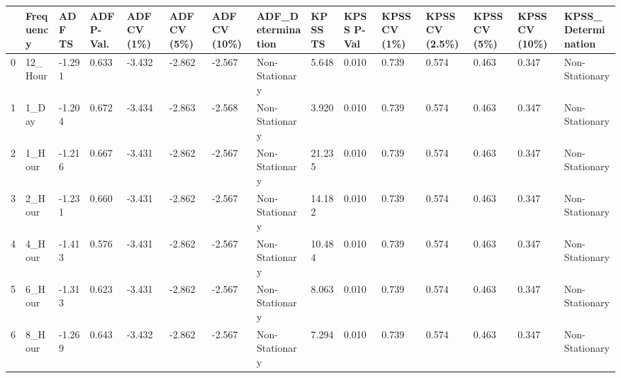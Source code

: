 \begin{tabular}{lllllllllllllll}
\toprule
 & Frequency & ADF TS & ADF P-Val. & ADF CV (1\%) & ADF CV (5\%) & ADF CV (10\%) & ADF_Determination & KPSS TS & KPSS P-Val & KPSS CV (1\%) & KPSS CV (2.5\%) & KPSS CV (5\%) & KPSS CV (10\%) & KPSS_Determination \\
\midrule
0 & 12_Hour & -1.291 & 0.633 & -3.432 & -2.862 & -2.567 & Non-Stationary & 5.648 & 0.010 & 0.739 & 0.574 & 0.463 & 0.347 & Non-Stationary \\
1 & 1_Day & -1.204 & 0.672 & -3.434 & -2.863 & -2.568 & Non-Stationary & 3.920 & 0.010 & 0.739 & 0.574 & 0.463 & 0.347 & Non-Stationary \\
2 & 1_Hour & -1.216 & 0.667 & -3.431 & -2.862 & -2.567 & Non-Stationary & 21.235 & 0.010 & 0.739 & 0.574 & 0.463 & 0.347 & Non-Stationary \\
3 & 2_Hour & -1.231 & 0.660 & -3.431 & -2.862 & -2.567 & Non-Stationary & 14.182 & 0.010 & 0.739 & 0.574 & 0.463 & 0.347 & Non-Stationary \\
4 & 4_Hour & -1.413 & 0.576 & -3.431 & -2.862 & -2.567 & Non-Stationary & 10.484 & 0.010 & 0.739 & 0.574 & 0.463 & 0.347 & Non-Stationary \\
5 & 6_Hour & -1.313 & 0.623 & -3.431 & -2.862 & -2.567 & Non-Stationary & 8.063 & 0.010 & 0.739 & 0.574 & 0.463 & 0.347 & Non-Stationary \\
6 & 8_Hour & -1.269 & 0.643 & -3.432 & -2.862 & -2.567 & Non-Stationary & 7.294 & 0.010 & 0.739 & 0.574 & 0.463 & 0.347 & Non-Stationary \\
\bottomrule
\end{tabular}
